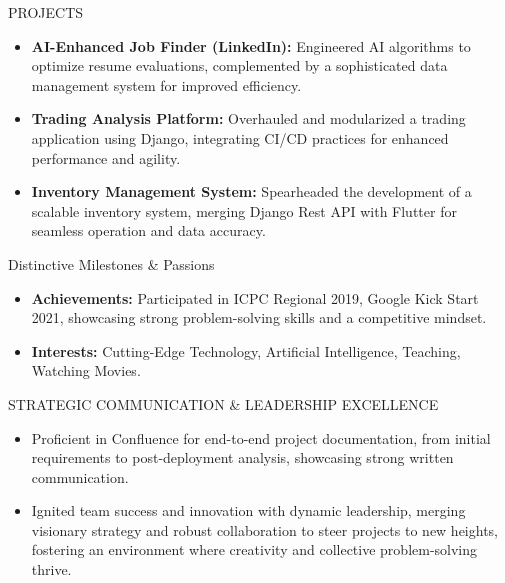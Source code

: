 \documentclass{resume} %
\begin{document}

\begin{rSection}{PROJECTS}
\begin{itemize}
    \item \textbf{AI-Enhanced Job Finder (LinkedIn):} {Engineered AI algorithms to optimize resume evaluations, complemented by a sophisticated data management system for improved efficiency.}
    \item \textbf{Trading Analysis Platform:} {Overhauled and modularized a trading application using Django, integrating CI/CD practices for enhanced performance and agility.}
    \item \textbf{Inventory Management System:} {Spearheaded the development of a scalable inventory system, merging Django Rest API with Flutter for seamless operation and data accuracy.} 
\end{itemize}

\end{rSection} 

\begin{rSection}{Distinctive Milestones \& Passions} 
\begin{itemize} 
    \item \textbf{Achievements:} {Participated in ICPC Regional 2019, Google Kick Start 2021, showcasing strong problem-solving skills and a competitive mindset.}
    \item \textbf{Interests:} {Cutting-Edge Technology, Artificial Intelligence, Teaching, Watching Movies.}
\end{itemize}


\end{rSection}

\begin{rSection}{STRATEGIC COMMUNICATION \& LEADERSHIP EXCELLENCE} 
\begin{itemize}
    \item Proficient in Confluence for end-to-end project documentation, from initial requirements to post-deployment analysis, showcasing strong written communication.
    \item Ignited team success and innovation with dynamic leadership, merging visionary strategy and robust collaboration to steer projects to new heights, fostering an environment where creativity and collective problem-solving thrive.
\end{itemize}


\end{rSection}
\end{document}
